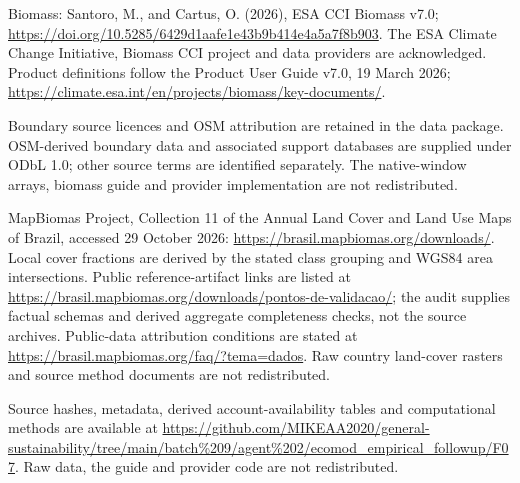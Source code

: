 \documentclass[11pt,a4paper]{article}
\begin{document}
Biomass: Santoro, M., and Cartus, O. (2026), ESA CCI Biomass v7.0; \url{https://doi.org/10.5285/6429d1aafe1e43b9b414e4a5a7f8b903}. The ESA Climate Change Initiative, Biomass CCI project and data providers are acknowledged. Product definitions follow the Product User Guide v7.0, 19 March 2026; \url{https://climate.esa.int/en/projects/biomass/key-documents/}.

Boundary source licences and OSM attribution are retained in the data package. OSM-derived boundary data and associated support databases are supplied under ODbL 1.0; other source terms are identified separately. The native-window arrays, biomass guide and provider implementation are not redistributed.

MapBiomas Project, Collection 11 of the Annual Land Cover and Land Use Maps of Brazil, accessed 29 October 2026: \url{https://brasil.mapbiomas.org/downloads/}. Local cover fractions are derived by the stated class grouping and WGS84 area intersections. Public reference-artifact links are listed at \url{https://brasil.mapbiomas.org/downloads/pontos-de-validacao/}; the audit supplies factual schemas and derived aggregate completeness checks, not the source archives. Public-data attribution conditions are stated at \url{https://brasil.mapbiomas.org/faq/?tema=dados}. Raw country land-cover rasters and source method documents are not redistributed.

Source hashes, metadata, derived account-availability tables and computational methods are available at \url{https://github.com/MIKEAA2020/general-sustainability/tree/main/batch%209/agent%202/ecomod_empirical_followup/F07}. Raw data, the guide and provider code are not redistributed.
\end{document}
